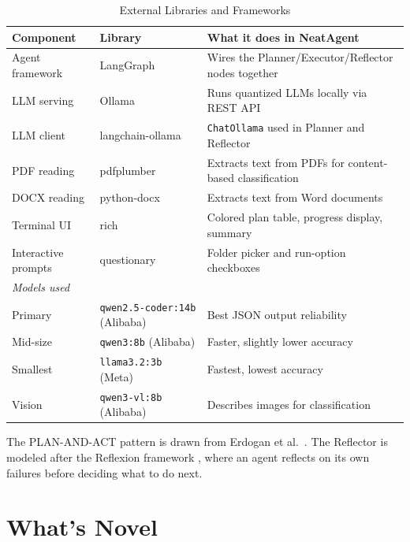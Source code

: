 \documentclass{article}
\begin{document}
\begin{table}[H]
\centering
\caption{External Libraries and Frameworks}
\begin{tabular}{lll}
\toprule
\textbf{Component} & \textbf{Library} & \textbf{What it does in NeatAgent} \\
\midrule
Agent framework     & LangGraph \cite{langgraph}       & Wires the Planner/Executor/Reflector nodes together \\
LLM serving         & Ollama                           & Runs quantized LLMs locally via REST API \\
LLM client          & langchain-ollama                 & \texttt{ChatOllama} used in Planner and Reflector \\
PDF reading         & pdfplumber                       & Extracts text from PDFs for content-based classification \\
DOCX reading        & python-docx                      & Extracts text from Word documents \\
Terminal UI         & rich                             & Colored plan table, progress display, summary \\
Interactive prompts & questionary                      & Folder picker and run-option checkboxes \\
\midrule
\multicolumn{3}{l}{\textit{Models used}} \\
\midrule
Primary     & \texttt{qwen2.5-coder:14b} (Alibaba) & Best JSON output reliability \\
Mid-size    & \texttt{qwen3:8b} (Alibaba)          & Faster, slightly lower accuracy \\
Smallest    & \texttt{llama3.2:3b} (Meta)          & Fastest, lowest accuracy \\
Vision      & \texttt{qwen3-vl:8b} (Alibaba)       & Describes images for classification \\
\bottomrule
\end{tabular}
\end{table}

The PLAN-AND-ACT pattern is drawn from Erdogan et al.\ \cite{erdogan2025planact}. The Reflector is modeled after the Reflexion framework \cite{anthropic2024agents}, where an agent reflects on its own failures before deciding what to do next.

\section{What's Novel}
\end{document}

